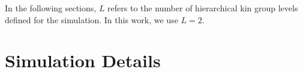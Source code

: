 

\dissertationexclude{\clearpage}
\dissertationexclude{\onecolumn}



\dissertationexclude{\clearpage}



\dissertationexclude{\clearpage}
\dissertationexclude{\twocolumn}






% 


In the following sections, $L$ refers to the number of hierarchical kin group levels defined for the simulation.
In this work, we use $L=2$.










\section{Simulation Details}
\label{sec:simulation-details}

